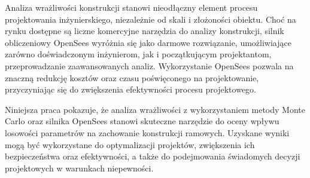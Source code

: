 Analiza wrażliwości konstrukcji stanowi nieodłączny element procesu projektowania inżynierskiego, niezależnie od skali i złożoności obiektu.
Choć na rynku dostępne są liczne komercyjne narzędzia do analizy konstrukcji, silnik obliczeniowy OpenSees wyróżnia się jako darmowe rozwiązanie, umożliwiające zarówno doświadczonym inżynierom, jak i początkującym projektantom, przeprowadzanie zaawansowanych analiz.
Wykorzystanie OpenSees pozwala na znaczną redukcję kosztów oraz czasu poświęconego na projektowanie, przyczyniając się do zwiększenia efektywności procesu projektowego.

Niniejsza praca pokazuje, że analiza wrażliwości z wykorzystaniem metody Monte Carlo oraz silnika OpenSees stanowi skuteczne narzędzie do oceny wpływu losowości parametrów na zachowanie konstrukcji ramowych.
Uzyskane wyniki mogą być wykorzystane do optymalizacji projektów, zwiększenia ich bezpieczeństwa oraz efektywności, a także do podejmowania świadomych decyzji projektowych w warunkach niepewności.
